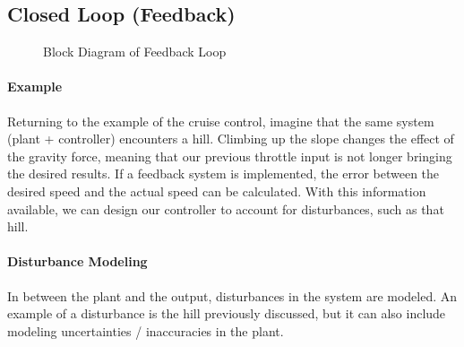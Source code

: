 \documentclass[../notes.tex]{subfiles}
\begin{document}
\subsection{Closed Loop (Feedback)}
\begin{figure}[H]
    \centering
    \caption{Block Diagram of Feedback Loop}
    \label{fig:feedbackBlock}
\end{figure}

\paragraph{Example} Returning to the example of the cruise control, imagine that the same system (plant + controller) encounters a hill. Climbing up the slope changes the effect of the gravity force, meaning that our previous throttle input is not longer bringing the desired results. If a feedback system is implemented, the error between the desired speed and the actual speed can be calculated. With this information available, we can design our controller to account for disturbances, such as that hill.

\paragraph{Disturbance Modeling}
In between the plant and the output, disturbances in the system are modeled. An example of a disturbance is the hill previously discussed, but it can also include modeling uncertainties / inaccuracies in the plant.
\end{document}
